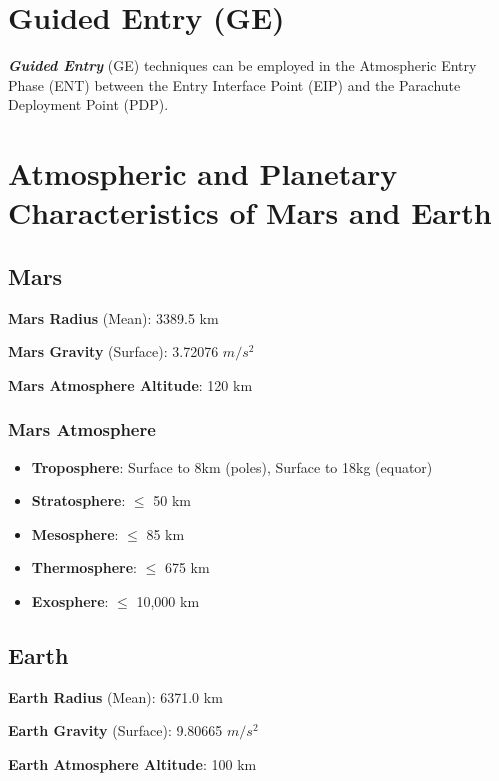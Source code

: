 
\section{Guided Entry (GE)}

    \textbf{\textit{Guided Entry}} (GE) techniques can be employed in the Atmospheric Entry Phase (ENT)
    between the Entry Interface Point (EIP) and the Parachute Deployment Point (PDP).

\section{Atmospheric and Planetary Characteristics of Mars and Earth}

    \subsection{Mars}

        \textbf{Mars Radius} (Mean): 3389.5 km

        \textbf{Mars Gravity} (Surface): 3.72076 $m/s^2$

        \textbf{Mars Atmosphere Altitude}: 120 km

        \subsubsection{Mars Atmosphere}

            \begin{itemize}
                \item \textbf{Troposphere}: Surface to 8km (poles), Surface to 18kg (equator)
                \item \textbf{Stratosphere}: $\leq$ 50 km
                \item \textbf{Mesosphere}: $\leq$ 85 km
                \item \textbf{Thermosphere}: $\leq$ 675 km
                \item \textbf{Exosphere}: $\leq$ 10,000 km 
            \end{itemize}


    \subsection{Earth}

        \textbf{Earth Radius} (Mean): 6371.0 km

        \textbf{Earth Gravity} (Surface): 9.80665 $m/s^2$

        \textbf{Earth Atmosphere Altitude}: 100 km

